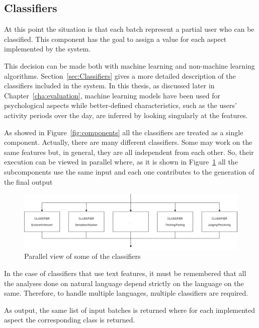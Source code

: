 \subsection{Classifiers}
At this point the situation is that each batch represent a partial user who can be classified. 
This component has the goal to assign a value for each aspect implemented by the system.

This decision can be made both with machine learning and non-machine learning algorithms. Section~\ref{sec:Classifiers} gives a more detailed description of the classifiers included in the system.
In this thesis, as discussed later in Chapter~\ref{cha:evaluation}, machine learning models have been used for psychological aspects while better-defined characteristics, such as the users' activity periods over the day, are inferred by looking singularly at the features.

As showed in Figure~\ref{fig:components} all the classifiers are treated as a single component. Actually, there are many different classifiers.
Some may work on the same features but, in general, they are all independent from each other.
So, their execution can be viewed in parallel where, as it is shown in Figure~\ref{fig:classifiers} all the subcomponents use the same input and each one contributes to the generation of the final output

\begin{figure}[htp]
    \centering
    \includegraphics[width=%
    1.0\textwidth,keepaspectratio]{img/classifiers}
    \caption{Parallel view of some of the classifiers}
    \label{fig:classifiers}
\end{figure}

In the case of classifiers that use text features, it must be remembered that all the analyses done on natural language depend strictly on the language on the same.
Therefore, to handle multiple languages, multiple classifiers are required.

As output, the same list of input batches is returned where for each implemented aspect the corresponding class is returned.


